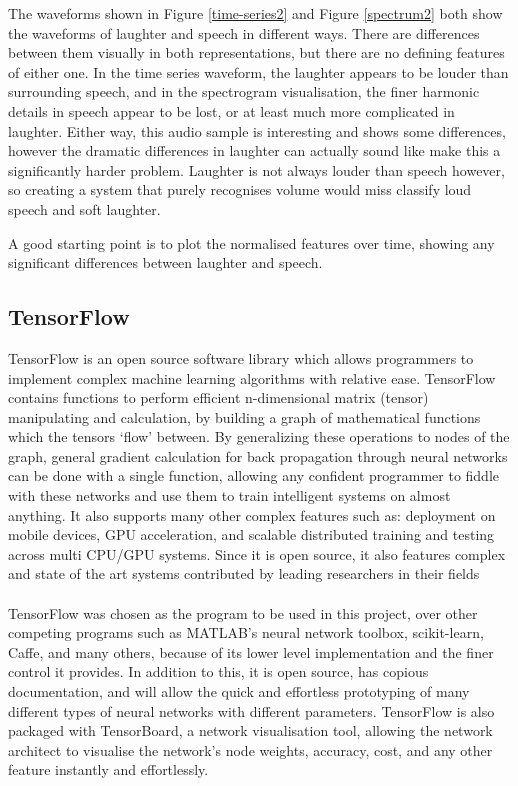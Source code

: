 \documentclass[a4paper,11pt,notitlepage]{article}
\begin{document}
The waveforms shown in Figure \ref{time-series2} and Figure \ref{spectrum2} both show the waveforms of laughter and speech in different ways. There are differences between them visually in both representations, but there are no defining features of either one. In the time series waveform, the laughter appears to be louder than surrounding speech, and in the spectrogram visualisation, the finer harmonic details in speech appear to be lost, or at least much more complicated in laughter. Either way, this audio sample is interesting and shows some differences, however the dramatic differences in laughter can actually sound like make this a significantly harder problem. Laughter is not always louder than speech however, so creating a system that purely recognises volume would miss classify loud speech and soft laughter.

A good starting point is to plot the normalised features over time, showing any significant differences between laughter and speech.




\subsection{TensorFlow}\label{section:Tensorflow}


TensorFlow is an open source software library which allows programmers to implement complex machine learning algorithms with relative ease. TensorFlow contains functions to perform efficient n-dimensional matrix (tensor) manipulating and calculation, by building a graph of mathematical functions which the tensors `flow' between. By generalizing these operations to nodes of the graph, general gradient calculation for back propagation through neural networks can be done with a single function, allowing any confident programmer to fiddle with these networks and use them to train intelligent systems on almost anything. It also supports many other complex features such as: deployment on mobile devices, GPU acceleration, and scalable distributed training and testing across multi CPU/GPU systems. Since it is open source, it also features complex and state of the art systems contributed by leading researchers in their fields\\
\\
TensorFlow was chosen as the program to be used in this project, over other competing programs such as MATLAB's neural network toolbox, scikit-learn, Caffe, and many others, because of its lower level implementation and the finer control it provides. In addition to this, it is open source, has copious documentation, and will allow the quick and effortless prototyping of many different types of neural networks with different parameters. TensorFlow is also packaged with TensorBoard, a network visualisation tool, allowing the network architect to visualise the network's node weights, accuracy, cost, and any other feature instantly and effortlessly.
\end{document}
